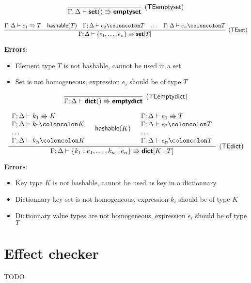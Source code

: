 \documentclass[a4paper]{article}
\newcommand{\kw}[1]{\textsf{\textbf{#1}}}
\newcommand{\mcode}[1]{\mathsf{#1}}
\newcommand{\colcol}{\coloncolon}
\newcommand{\yield}{\Rrightarrow}
\newcommand{\fun}[1]{\mathsf{#1}}
\begin{document}
$$
\infer[(\fun{TEemptyset})]{\Gamma;\Delta \vdash \kw{set}() \yield \kw{emptyset}}
  {}
$$

$$
\infer[(\fun{TEset})]{\Gamma;\Delta \vdash \mcode{\{}e_1,\ldots,e_n\mcode{\}} \yield \kw{set}[T]}
  {\Gamma;\Delta \vdash e_1 \yield T & \fun{hashable}(T) & \Gamma;\Delta \vdash e_2 \colcol T & \ldots &  \Gamma;\Delta \vdash e_n \colcol T}
$$

\textbf{Errors}:
\begin{itemize}
\item Element type $T$ is not hashable, cannot be used in a set   
\item Set is not homogeneous, expression $e_i$ should be of type $T$
\end{itemize}

$$
\infer[(\fun{TEemptydict})]{\Gamma;\Delta \vdash \kw{dict}() \yield \kw{emptydict}}
  {}
$$

$$
\infer[(\fun{TEdict})]{\Gamma;\Delta \vdash \mcode{\{}k_1:e_1,\ldots,k_n:e_n\mcode{\}} \yield \kw{dict}[K:T]}
      {\begin{array}{l}
          \Gamma;\Delta \vdash k_1 \yield K\\
          \Gamma;\Delta \vdash k_2 \colcol K\\
          \ldots\\
          \Gamma;\Delta \vdash k_n \colcol K
        \end{array} & \fun{hashable}(K) & \begin{array}{l}
          \Gamma;\Delta \vdash e_1 \yield T \\
          \Gamma;\Delta \vdash e_2 \colcol T\\
          \ldots \\
          \Gamma;\Delta \vdash e_n \colcol T\end{array}}
$$

\textbf{Errors}:
\begin{itemize}
\item Key type $K$ is not hashable, cannot be used as key in a dictionnary   
\item Dictionnary key set is not homogeneous, expression $k_i$ should be of type $K$
\item Dictionnary value types are not homogeneous, expression $e_i$ should be of type $T$
\end{itemize}


\section{Effect checker}

TODO
\end{document}
